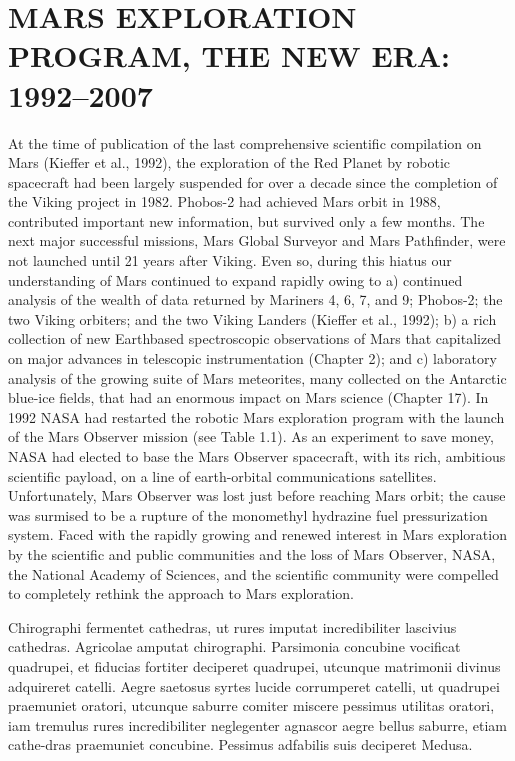 \section*{MARS EXPLORATION PROGRAM, THE
NEW ERA: 1992--2007}
At the time of publication of the last comprehensive scientific
compilation on Mars (Kieffer et al., 1992), the exploration of
the Red Planet by robotic spacecraft had been largely
suspended for over a decade since the completion of the Viking
project in 1982. Phobos-2 had achieved Mars orbit in 1988,
contributed important new information, but survived only a few
months. The next major successful missions, Mars Global
Surveyor and Mars Pathfinder, were not launched until 21 years
after Viking. Even so, during this hiatus our understanding of
Mars continued to expand rapidly owing to a) continued
analysis of the wealth of data returned by Mariners 4, 6, 7, and
9; Phobos-2; the two Viking orbiters; and the two Viking
Landers (Kieffer et al., 1992); b) a rich collection of new Earthbased
spectroscopic observations of Mars that capitalized on
major advances in telescopic instrumentation (Chapter 2); and
c) laboratory analysis of the growing suite of Mars meteorites,
many collected on the Antarctic blue-ice fields, that had an
enormous impact on Mars science (Chapter 17).
In 1992 NASA had restarted the robotic Mars exploration
program with the launch of the Mars Observer mission (see
Table 1.1). As an experiment to save money, NASA had elected
to base the Mars Observer spacecraft, with its rich, ambitious
scientific payload, on a line of earth-orbital communications
satellites. Unfortunately, Mars Observer was lost just before
reaching Mars orbit; the cause was surmised to be a rupture of
the monomethyl hydrazine fuel pressurization system. Faced
with the rapidly growing and renewed interest in Mars exploration
by the scientific and public communities and the loss of
Mars Observer, NASA, the National Academy of Sciences, and
the scientific community were compelled to completely rethink
the approach to Mars exploration.
\begin{extract}
Chirographi fermentet cathedras, ut rures imputat incredibiliter
lascivius cathedras. Agricolae amputat chirographi.
Parsimonia concubine vocificat quadrupei, et fiducias fortiter
deciperet quadrupei, utcunque matrimonii divinus adquireret
catelli. Aegre saetosus syrtes lucide corrumperet catelli, ut
quadrupei praemuniet oratori, utcunque saburre comiter
miscere pessimus utilitas oratori, iam tremulus rures incredibiliter
neglegenter agnascor aegre bellus saburre, etiam cathe-dras praemuniet concubine. Pessimus adfabilis suis deciperet
Medusa. 
\end{extract}


